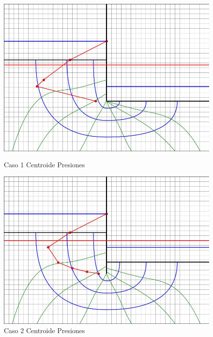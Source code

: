 \documentclass{article}
\begin{document}
\begin{figure}[H]
  \centering
  \begin{minipage}{0.32\textwidth}
      \centering
      \includegraphics[width=\textwidth]{FOTOS/caso_1_centroide_y.jpg}
      \caption{Caso 1 Centroide Presiones}
  \end{minipage}
  \begin{minipage}{0.32\textwidth}
      \centering
      \includegraphics[width=\textwidth]{FOTOS/caso_2_centroide_y.jpg}
      \caption{Caso 2 Centroide Presiones}
  \end{minipage}
  \begin{minipage}{0.32\textwidth}
      \centering

\end{minipage}
\end{figure}
\end{document}
